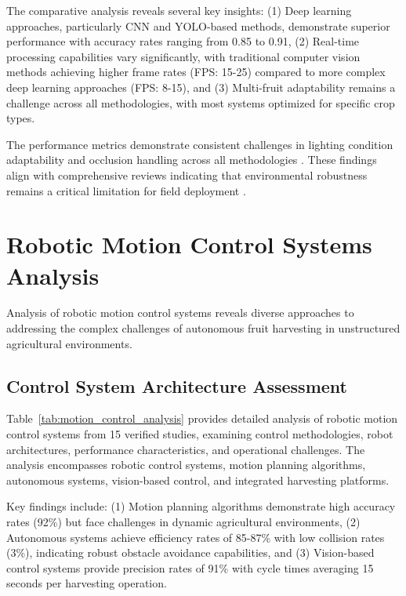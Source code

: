 \documentclass{ieeeaccess}
\begin{document}
The comparative analysis reveals several key insights: (1) Deep learning approaches, particularly CNN and YOLO-based methods, demonstrate superior performance with accuracy rates ranging from 0.85 to 0.91, (2) Real-time processing capabilities vary significantly, with traditional computer vision methods achieving higher frame rates (FPS: 15-25) compared to more complex deep learning approaches (FPS: 8-15), and (3) Multi-fruit adaptability remains a challenge across all methodologies, with most systems optimized for specific crop types.



The performance metrics demonstrate consistent challenges in lighting condition adaptability and occlusion handling across all methodologies \cite{tang2020recognition,mavridou2019machine}. These findings align with comprehensive reviews indicating that environmental robustness remains a critical limitation for field deployment \cite{hameed2018comprehensive}.

\section{Robotic Motion Control Systems Analysis}
\label{sec:motion}

Analysis of robotic motion control systems reveals diverse approaches to addressing the complex challenges of autonomous fruit harvesting in unstructured agricultural environments.

\subsection{Control System Architecture Assessment}

Table~\ref{tab:motion_control_analysis} provides detailed analysis of robotic motion control systems from 15 verified studies, examining control methodologies, robot architectures, performance characteristics, and operational challenges. The analysis encompasses robotic control systems, motion planning algorithms, autonomous systems, vision-based control, and integrated harvesting platforms.

Key findings include: (1) Motion planning algorithms demonstrate high accuracy rates (92\%) but face challenges in dynamic agricultural environments, (2) Autonomous systems achieve efficiency rates of 85-87\% with low collision rates (3\%), indicating robust obstacle avoidance capabilities, and (3) Vision-based control systems provide precision rates of 91\% with cycle times averaging 15 seconds per harvesting operation.
\end{document}

